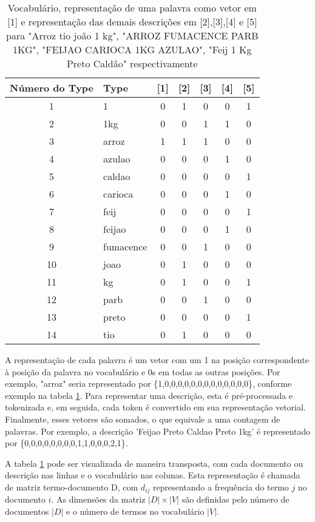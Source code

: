 \begin{table}
\begin{tabular}{c|l|c|c|c|c|c}
\hline
Número do Type & Type & [1] & [2] & [3] & [4] & [5] \\
\hline
1 & 1 & 0 & 1 & 0 & 0 & 1 \\
2 & 1kg & 0 & 0 & 1 & 1 & 0 \\
3 & arroz & 1 & 1 & 1 & 0 & 0 \\
4 & azulao & 0 & 0 & 0 & 1 & 0 \\
5 & caldao & 0 & 0 & 0 & 0 & 1 \\
6 & carioca & 0 & 0 & 0 & 1 & 0 \\
7 & feij & 0 & 0 & 0 & 0 & 1 \\
8 & feijao & 0 & 0 & 0 & 1 & 0 \\
9 & fumacence & 0 & 0 & 1 & 0 & 0 \\
10 & joao & 0 & 1 & 0 & 0 & 0 \\
11 & kg & 0 & 1 & 0 & 0 & 1 \\
12 & parb & 0 & 0 & 1 & 0 & 0 \\
13 & preto & 0 & 0 & 0 & 0 & 1 \\
14 & tio & 0 & 1 & 0 & 0 & 0 \\
\hline
\end{tabular}
\caption{Vocabulário, representação de uma palavra como vetor em [1] e representação das demais descrições em [2],[3],[4] e [5] para "Arroz tio joão 1 kg", "ARROZ FUMACENCE PARB 1KG", "FEIJAO CARIOCA 1KG AZULAO", "Feij 1 Kg Preto Caldão" respectivamente}
\label{tab:bow}
\end{table}

A representação de cada palavra é um vetor com um 1 na posição correspondente à posição da palavra no vocabulário e 0s em todas as outras posições. Por exemplo, "arroz" seria representado por \{1,0,0,0,0,0,0,0,0,0,0,0,0,0\}, conforme exemplo na tabela \ref{tab:bow}. Para representar uma descrição, 
 esta é pré-processada e tokenizada e, em seguida, cada token é convertido em sua representação vetorial. Finalmente, esses vetores são somados, o que equivale a uma contagem de palavras. Por exemplo, a descrição 'Feijao Preto Caldao Preto 1kg' é representado por \{0,0,0,0,0,0,0,0,1,1,0,0,0,2,1\}.  

A tabela \ref{tab:bow} pode ser visualizada de maneira transposta, com cada documento ou descrição nas linhas e o vocabulário nas colunas. Esta representação é chamada de matriz termo-documento D, com \( d_{ij} \) representando a frequência do termo \( j \) no documento \( i \). As dimensões da matriz \( |D| \times |V| \) são definidas pelo número de documentos \( |D| \) e o número de termos no vocabulário \( |V| \).

